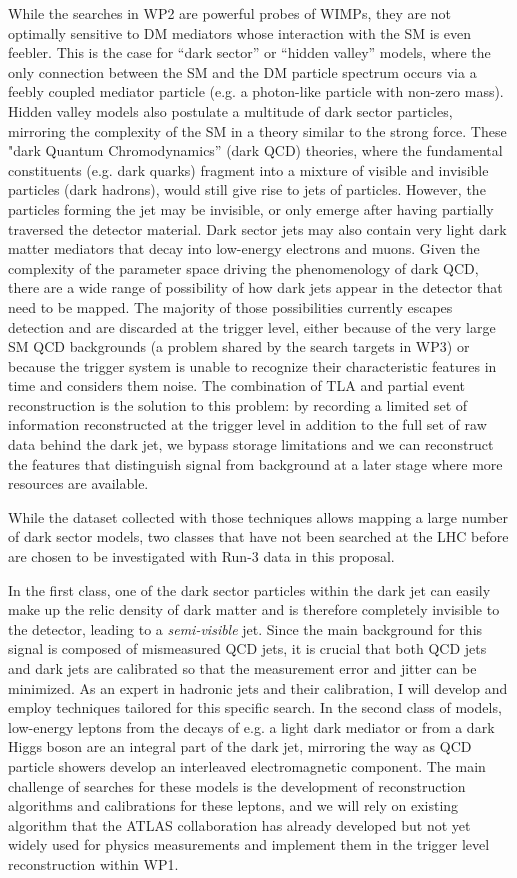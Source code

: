 \documentclass[11pt,a4paper]{article}
\begin{document}
While the searches in WP2 are powerful probes of WIMPs, they are not optimally sensitive to DM mediators whose interaction with the SM is even feebler. This is the case for “dark sector” or “hidden valley” models\cite{Zurek}, where the only connection between the SM and the DM particle spectrum occurs via a feebly coupled mediator particle (e.g. a photon-like particle with non-zero mass). Hidden valley models also postulate a multitude of dark sector particles, mirroring the complexity of the SM in a theory similar to the strong force.  
These "dark Quantum Chromodynamics” (dark QCD) theories, where the fundamental constituents (e.g. dark quarks) fragment into a mixture of visible and invisible particles (dark hadrons), would still give rise to jets of particles. However, the particles forming the jet may be invisible, or only emerge after having partially traversed the detector material. Dark sector jets may also contain very light dark matter mediators that decay into low-energy electrons and muons. 
Given the complexity of the parameter space driving the phenomenology of dark QCD, there are a wide range of possibility of how dark jets appear in the detector that need to be mapped. The majority of those possibilities currently escapes detection and are discarded at the trigger level, either because of the very large SM QCD  backgrounds (a problem shared by the search targets in WP3) or because the trigger system is unable to recognize their characteristic features in time and considers them noise.  
The combination of TLA and partial event reconstruction is the solution to this problem: by recording a limited set of information reconstructed at the trigger level in addition to the full set of raw data behind the dark jet, we bypass storage limitations and we can reconstruct the features that distinguish signal from background at a later stage where more resources are available. 

While the dataset collected with those techniques allows mapping a large number of dark sector models, two classes that have not been searched at the LHC before are chosen to be investigated with Run-3 data in this proposal.

In the first class, one of the dark sector particles within the dark jet can easily make up the relic density of dark matter and is therefore completely invisible to the detector, leading to a \textit{semi-visible} jet. Since the main background for this signal is composed of mismeasured QCD jets, it is crucial that both QCD jets and dark jets are calibrated so that the measurement error and jitter can be minimized. As an expert in hadronic jets and their calibration, I will develop and employ techniques tailored for this specific search. 
In the second class of models, low-energy leptons from the decays of e.g. a light dark mediator or from a dark Higgs boson are an integral part of the dark jet, mirroring the way as QCD particle showers develop an interleaved electromagnetic component. The main challenge of searches for these models is the development of reconstruction algorithms and calibrations for these leptons, and we will rely on existing algorithm that the ATLAS collaboration has already developed but not yet widely used for physics measurements and implement them in the trigger level reconstruction within WP1. 
\end{document}
